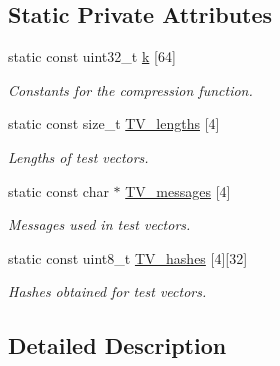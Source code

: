 \subsection*{Static Private Attributes}
\begin{DoxyCompactItemize}
\item 
\hypertarget{classSHA256_a93554eacfa4c6b5f542d1c1e161e13d6}{}static const uint32\+\_\+t \hyperlink{classSHA256_a93554eacfa4c6b5f542d1c1e161e13d6}{k} \mbox{[}64\mbox{]}\label{classSHA256_a93554eacfa4c6b5f542d1c1e161e13d6}

\begin{DoxyCompactList}\small\item\em Constants for the compression function. \end{DoxyCompactList}\item 
\hypertarget{classSHA256_ad4539b9c01d09226f1f31021c8cce4e1}{}static const size\+\_\+t \hyperlink{classSHA256_ad4539b9c01d09226f1f31021c8cce4e1}{T\+V\+\_\+lengths} \mbox{[}4\mbox{]}\label{classSHA256_ad4539b9c01d09226f1f31021c8cce4e1}

\begin{DoxyCompactList}\small\item\em Lengths of test vectors. \end{DoxyCompactList}\item 
\hypertarget{classSHA256_a90689626ad27d72f4c52e694ece0f8f6}{}static const char $\ast$ \hyperlink{classSHA256_a90689626ad27d72f4c52e694ece0f8f6}{T\+V\+\_\+messages} \mbox{[}4\mbox{]}\label{classSHA256_a90689626ad27d72f4c52e694ece0f8f6}

\begin{DoxyCompactList}\small\item\em Messages used in test vectors. \end{DoxyCompactList}\item 
\hypertarget{classSHA256_adf02f91a3a132332268d19cb699cc3b1}{}static const uint8\+\_\+t \hyperlink{classSHA256_adf02f91a3a132332268d19cb699cc3b1}{T\+V\+\_\+hashes} \mbox{[}4\mbox{]}\mbox{[}32\mbox{]}\label{classSHA256_adf02f91a3a132332268d19cb699cc3b1}

\begin{DoxyCompactList}\small\item\em Hashes obtained for test vectors. \end{DoxyCompactList}\end{DoxyCompactItemize}


\subsection{Detailed Description}


